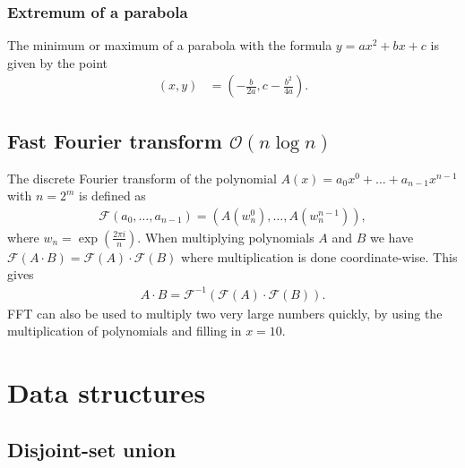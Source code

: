 \subsubsection{Extremum of a parabola}
The minimum or maximum of a parabola with the formula $y = ax^2 + bx + c$ is given by the point
\begin{align*}
    (x, y) &= \left(-\frac b{2a}, c - \frac{b^2}{4a}\right).
\end{align*}



\subsection{Fast Fourier transform $\mathcal O(n\log n)$}

The discrete Fourier transform of the polynomial $A(x) = a_0x^0 + \dots + a_{n - 1}x^{n - 1}$ with $n = 2^m$ is defined as
\begin{align*}
    \mathcal F(a_0, \dots, a_{n - 1}) = (A(w_n^0), \dots, A(w_n^{n-1})),
\end{align*}
where $w_n = \exp(\frac{2\pi i}n)$. When multiplying polynomials $A$ and $B$ we have $\mathcal F(A\cdot B) = \mathcal F(A) \cdot\mathcal F(B)$ where multiplication is done coordinate-wise. This gives
\begin{align*}
    A\cdot B = \mathcal F^{-1}(\mathcal F(A)\cdot \mathcal F(B)).
\end{align*}
FFT can also be used to multiply two very large numbers quickly, by using the multiplication of polynomials and filling in $x = 10$.






\section{Data structures}


\subsection{Disjoint-set union}

